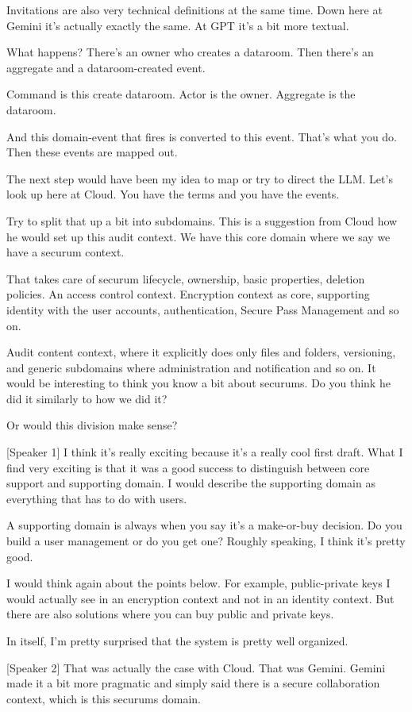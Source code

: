 Invitations are also very technical definitions at the same time. Down here at Gemini it's actually exactly the same. At GPT it's a bit more textual.

What happens? There's an owner who creates a dataroom. Then there's an aggregate and a dataroom-created event.

Command is this create dataroom. Actor is the owner. Aggregate is the dataroom.

And this domain-event that fires is converted to this event. That's what you do. Then these events are mapped out.

The next step would have been my idea to map or try to direct the LLM. Let's look up here at Cloud. You have the terms and you have the events.

Try to split that up a bit into subdomains. This is a suggestion from Cloud how he would set up this audit context. We have this core domain where we say we have a securum context.

That takes care of securum lifecycle, ownership, basic properties, deletion policies. An access control context. Encryption context as core, supporting identity with the user accounts, authentication, Secure Pass Management and so on.

Audit content context, where it explicitly does only files and folders, versioning, and generic subdomains where administration and notification and so on. It would be interesting to think you know a bit about securums. Do you think he did it similarly to how we did it?

Or would this division make sense?

[Speaker 1]
I think it's really exciting because it's a really cool first draft. What I find very exciting is that it was a good success to distinguish between core support and supporting domain. I would describe the supporting domain as everything that has to do with users.

A supporting domain is always when you say it's a make-or-buy decision. Do you build a user management or do you get one? Roughly speaking, I think it's pretty good.

I would think again about the points below. For example, public-private keys I would actually see in an encryption context and not in an identity context. But there are also solutions where you can buy public and private keys.

In itself, I'm pretty surprised that the system is pretty well organized.

[Speaker 2]
That was actually the case with Cloud. That was Gemini. Gemini made it a bit more pragmatic and simply said there is a secure collaboration context, which is this securums domain.

